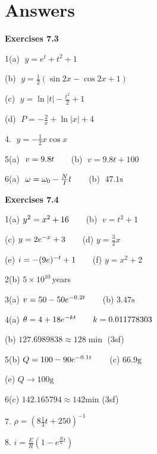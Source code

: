 \section{Answers}
\textbf{Exercises 7.3} 
\columnsep=30pt
\begin{multicols}{2}

1(a) $\;y =e^{t} +t^{2} +1$ 

(b) $\;y =\frac{1}{2} \left (\sin  2 x -\cos  2 x +1\right )$ 

(c) $\;y =\ln  \left \vert t\right \vert  -\frac{t^{2}}{2} +1$ 

(d) $\;P = -\frac{2}{x} +\ln  \left \vert x\right \vert  +4$ 

4. $\;y = -\frac{1}{2} x \cos  x$ 

5(a) $\;v =9.8 t\text{\quad \quad }$(b) $\;v =9.8 t +100$ 

6(a) $\;\omega  =\omega _{0} -\frac{N}{I} t\text{\quad \quad }$(b) $\;47.1 \mbox{s}$ 

\textbf{Exercises 7.4} 

1(a)  $y^{2} =x^{2} +16\text{\quad \quad }$(b) $\;v =t^{2} +1$ 

(c)  $y =2 e^{ -x} +3\text{\quad \quad }$(d)  $y =\frac{3}{2} x$ 

(e)  $i =-(9e)^{ -t} +1\text{\quad \quad }$(f)  $y =x^2+2$ 

2(b)  $5 \times 10^{10}\,$years 

3(a)  $v =50 -50 e^{ -0.2 t}\text{\quad \quad }$(b)  $3.47 \mbox{s}$ 

4(a)  $\theta  =4 +18 e^{ -k t}\text{\quad \quad }k =0.011778303$ 

(b)  $127.6989838 \approx 128\min $ (3sf) 

5(b)  $Q =100 -90 e^{ -0.1 t}\text{\quad \quad }$(c)  $66.9 \mbox{g}$ 

(e)  $Q \rightarrow 100 \mbox{g}$ 

6(c)  $142.165794 \approx 142 \mbox{min}$ (3sf) 

7.  $\rho  =\left (8\frac{1}{3} t +250\right )^{ -1}$ 

8.  $i =\frac{E}{R} \left (1 -e^{\frac{R}{L} t}\right )$ 
\end{multicols}
